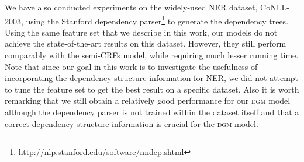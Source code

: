 We have also conducted experiments on the widely-used NER dataset, CoNLL-2003, using the Stanford dependency parser\footnote{http://nlp.stanford.edu/software/nndep.shtml} to generate the dependency trees. 
Using the same feature set that we describe in this work, our models do not achieve the state-of-the-art results on this dataset. However, they still perform comparably with the semi-CRFs model, while requiring much lesser running time.
Note that since our goal in this work is to investigate the usefulness of incorporating the dependency structure information for NER, we did not attempt to tune the feature set to get the best result on a specific dataset.
Also it is worth remarking that we still obtain a relatively good performance for our \textsc{dgm} model although the dependency parser is not trained within the dataset itself and that a correct dependency structure information is crucial for the \textsc{dgm} model.


